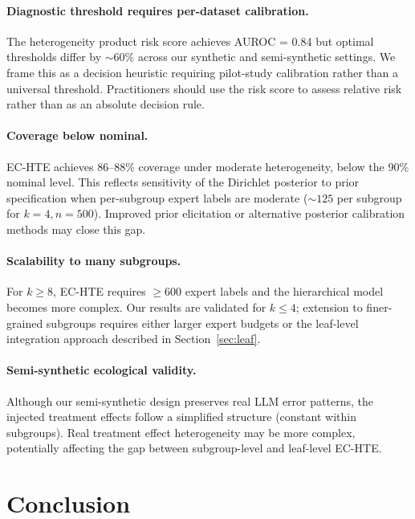\documentclass[11pt,a4paper]{article}
\begin{document}
\paragraph{Diagnostic threshold requires per-dataset calibration.}
The heterogeneity product risk score achieves AUROC = 0.84 but optimal thresholds differ by ${\sim}60\%$ across our synthetic and semi-synthetic settings.
We frame this as a decision heuristic requiring pilot-study calibration rather than a universal threshold.
Practitioners should use the risk score to assess relative risk rather than as an absolute decision rule.

\paragraph{Coverage below nominal.}
EC-HTE achieves 86--88\% coverage under moderate heterogeneity, below the 90\% nominal level.
This reflects sensitivity of the Dirichlet posterior to prior specification when per-subgroup expert labels are moderate (${\sim}125$ per subgroup for $k = 4, n = 500$).
Improved prior elicitation or alternative posterior calibration methods may close this gap.

\paragraph{Scalability to many subgroups.}
For $k \geq 8$, EC-HTE requires $\geq 600$ expert labels and the hierarchical model becomes more complex.
Our results are validated for $k \leq 4$; extension to finer-grained subgroups requires either larger expert budgets or the leaf-level integration approach described in Section~\ref{sec:leaf}.

\paragraph{Semi-synthetic ecological validity.}
Although our semi-synthetic design preserves real LLM error patterns, the injected treatment effects follow a simplified structure (constant within subgroups).
Real treatment effect heterogeneity may be more complex, potentially affecting the gap between subgroup-level and leaf-level EC-HTE.

\section{Conclusion}
\end{document}
